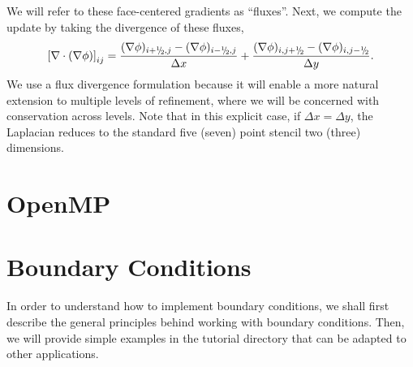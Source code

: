 We will refer to these face-centered gradients as ``fluxes''.
Next, we compute the update by taking the divergence of these fluxes,
\begin{equation}
\left[\nabla\cdot(\nabla\phi)\right]_{ij} = \frac{(\nabla\phi)_{i+\myhalf,j}-(\nabla\phi)_{i-\myhalf,j}}{\Delta x} + \frac{(\nabla\phi)_{i,j+\myhalf}-(\nabla\phi)_{i,j-\myhalf}}{\Delta y}.
\end{equation}
We use a flux divergence formulation because it will enable a more natural 
extension to multiple levels of refinement, where we will be concerned with
conservation across levels.  Note that in this explicit case, if $\Delta x = \Delta y$, 
the Laplacian reduces to the standard five (seven) point stencil two (three) dimensions.  

\section{OpenMP}\label{Sec:OpenMP}

\section{Boundary Conditions}\label{Sec:Boundary Conditions}
In order to understand how to implement boundary conditions, we shall 
first describe the general principles behind working with boundary conditions.
Then, we will provide simple examples in the tutorial directory that can be 
adapted to other applications.

